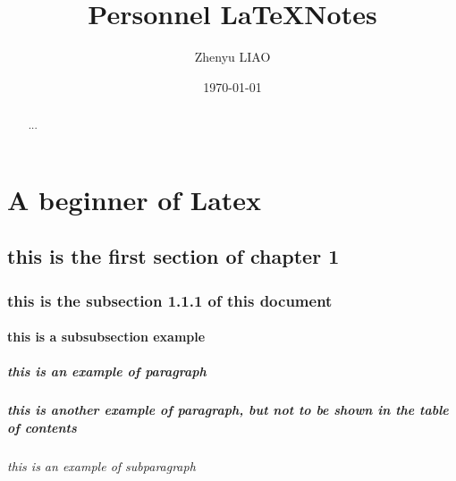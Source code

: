 \documentclass{report} %
\begin{document}

\title{Personnel \LaTeX Notes} %
\author{Zhenyu LIAO} 
\date{\today} 
\maketitle %

\begin{abstract} %
...
\end{abstract}

\setcounter{tocdepth}{5} %
\tableofcontents %

\chapter{A beginner of Latex}

\section{this is the first section of chapter 1}
\subsection{this is the subsection 1.1.1 of this document}
\subsubsection{this is a subsubsection example}
\paragraph{this is an example of paragraph}
\paragraph*{this is another example of paragraph, but not to be shown in the table of contents}
\subparagraph{this is an example of subparagraph}
\end{document}
